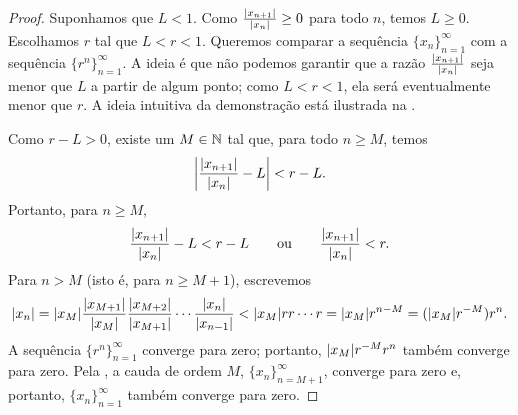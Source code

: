 \begin{proof}
Suponhamos que $L < 1$.
Como
$\frac{\lvert {x_{n+1}} \rvert}{\lvert {x_n} \rvert} \geq 0$ para todo $n$, temos $L \geq 0$. Escolhamos
$r$ tal que $L < r < 1$.
Queremos comparar a sequência $\{ x_n \}_{n=1}^\infty$ com a sequência $\{ r^n \}_{n=1}^\infty$.
A ideia é que não podemos garantir que a razão $\frac{\sabs{x_{n+1}}}{\sabs{x_n}}$ seja menor que $L$ a partir de algum ponto; como $L < r < 1$, ela será eventualmente menor que $r$.
A ideia intuitiva da demonstração está ilustrada na .
\begin{myfigureht}
\caption{Os traços curtos representam as razões
$\frac{\sabs{x_{n+1}}}{\sabs{x_n}}$
que convergem para $L < 1$.\label{figratseq}}
\end{myfigureht}

Como $r-L > 0$, existe um $M \in {\mathbb{N}}$ tal que, para
todo $n \geq M$, temos
\begin{equation*}
\left\lvert {\frac{\lvert {x_{n+1}} \rvert}{\lvert {x_n} \rvert} - L} \right\rvert < r-L .
\end{equation*}
Portanto, para $n \geq M$,
\begin{equation*}
\frac{\lvert {x_{n+1}} \rvert}{\lvert {x_n} \rvert} - L < r-L
\qquad \text{ou} \qquad
\frac{\lvert {x_{n+1}} \rvert}{\lvert {x_n} \rvert} < r .
\end{equation*}
Para $n > M$ (isto é, para $n \geq M+1$),
escrevemos
\begin{equation*}
\lvert {x_n} \rvert =
\lvert {x_M} \rvert
\frac{\lvert {x_{M+1}} \rvert}{\lvert {x_{M}} \rvert}
\frac{\lvert {x_{M+2}} \rvert}{\lvert {x_{M+1}} \rvert}
\cdots
\frac{\lvert {x_{n}} \rvert}{\lvert {x_{n-1}} \rvert}
<
\lvert {x_M} \rvert
r r \cdots r = \lvert {x_M} \rvert r^{n-M} = (\lvert {x_M} \rvert r^{-M}) r^n .
\end{equation*}
A sequência $\{ r^n \}_{n=1}^\infty$ converge para zero; portanto,
$\lvert {x_M} \rvert r^{-M} r^n$ também converge para zero. Pela ,
a cauda de ordem $M$,
$\{x_n\}_{n=M+1}^\infty$, converge para zero e, portanto, $\{x_n\}_{n=1}^\infty$ também converge para zero.


\end{proof}
